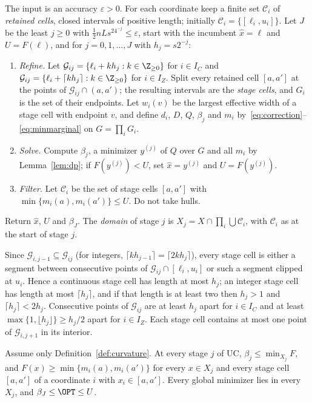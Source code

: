 \begin{algorithm}\label{alg:uc}
The input is an accuracy $\varepsilon>0$. For each coordinate keep a finite
set $\mathcal C_i$ of \emph{retained cells}, closed intervals of positive
length; initially $\mathcal C_i=\{[\ell_i,u_i]\}$. Let $J$ be the least
$j\ge0$ with $\frac12nLs^24^{-j}\le\varepsilon$, start with the incumbent
$\hat x=\ell$ and $U=F(\ell)$, and for $j=0,1,\dots,J$ with $h_j=s2^{-j}$:
\begin{enumerate}[label=(\roman*)]
\item \emph{Refine.} Let $\mathcal G_{ij}=\{\ell_i+kh_j:k\in\Z_{\ge0}\}$ for
$i\in I_C$ and $\mathcal G_{ij}=\{\ell_i+\lceil kh_j\rceil:k\in\Z_{\ge0}\}$ for
$i\in I_Z$. Split every retained cell $[a,a']$ at the points of
$\mathcal G_{ij}\cap(a,a')$; the resulting intervals are the \emph{stage
cells}, and $G_i$ is the set of their endpoints. Let $w_i(v)$ be the largest
effective width of a stage cell with endpoint $v$, and define $d_i$, $D$,
$Q$, $\beta_j$ and $m_i$ by~\eqref{eq:correction}--\eqref{eq:minmarginal} on
$G=\prod_iG_i$.
\item \emph{Solve.} Compute $\beta_j$, a minimizer $y^{(j)}$ of $Q$ over $G$
and all $m_i$ by Lemma~\ref{lem:dp}; if $F(y^{(j)})<U$, set $\hat x=y^{(j)}$
and $U=F(y^{(j)})$.
\item \emph{Filter.} Let $\mathcal C_i$ be the set of stage cells $[a,a']$
with $\min\{m_i(a),m_i(a')\}\le U$. Do not take hulls.
\end{enumerate}
Return $\hat x$, $U$ and $\beta_J$. The \emph{domain} of stage $j$ is
$X_j=X\cap\prod_i\bigcup\mathcal C_i$, with $\mathcal C_i$ as at the start of
stage $j$.
\end{algorithm}

Since $\mathcal G_{i,j-1}\subseteq\mathcal G_{ij}$ (for integers,
$\lceil kh_{j-1}\rceil=\lceil 2kh_j\rceil$), every stage cell is either a
segment between consecutive points of $\mathcal G_{ij}\cap[\ell_i,u_i]$ or
such a segment clipped at $u_i$. Hence a continuous stage cell has length at
most $h_j$; an integer stage cell has length at most $\lceil h_j\rceil$, and
if that length is at least two then $h_j>1$ and $\lceil h_j\rceil<2h_j$.
Consecutive points of $\mathcal G_{ij}$ are at least $h_j$ apart for
$i\in I_C$ and at least $\max\{1,\lfloor h_j\rfloor\}\ge h_j/2$ apart for
$i\in I_Z$. Each stage cell contains at most one point of
$\mathcal G_{i,j+1}$ in its interior.

\begin{lemma}\label{lem:cells}
Assume only Definition~\ref{def:curvature}. At every stage $j$ of UC,
$\beta_j\le\min_{X_j}F$, and $F(x)\ge\min\{m_i(a),m_i(a')\}$ for every
$x\in X_j$ and every stage cell $[a,a']$ of a coordinate $i$ with
$x_i\in[a,a']$. Every global minimizer lies in every $X_j$, and
$\beta_J\le\OPT\le U$.
\end{lemma}

